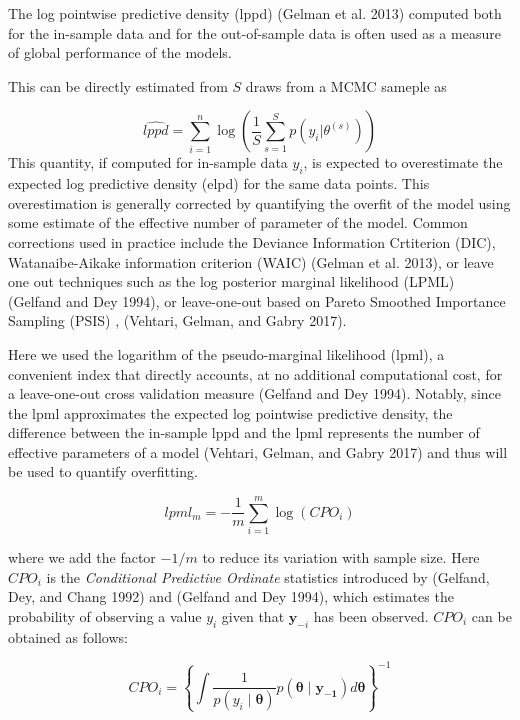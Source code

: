\documentclass[]{article}
\begin{document}
The log pointwise predictive density (lppd) (Gelman et al. 2013)
computed both for the in-sample data and for the out-of-sample data is
often used as a measure of global performance of the models.

This can be directly estimated from \(S\) draws from a MCMC sameple as

\begin{equation}
        \widehat{lppd} = \sum_{i = 1}^{n} \log \left( \frac{1}{S}\sum_{s = 1}^{S} p(y_i \lvert
    {\theta}^{(s)})\right)
\end{equation} This quantity, if computed for in-sample data \(y_i\), is
expected to overestimate the expected log predictive density (elpd) for
the same data points. This overestimation is generally corrected by
quantifying the overfit of the model using some estimate of the
effective number of parameter of the model. Common corrections used in
practice include the Deviance Information Crtiterion (DIC),
Watanaibe-Aikake information criterion (WAIC) (Gelman et al. 2013), or
leave one out techniques such as the log posterior marginal likelihood
(LPML) (Gelfand and Dey 1994), or leave-one-out based on Pareto Smoothed
Importance Sampling (PSIS) , (Vehtari, Gelman, and Gabry 2017).

Here we used the logarithm of the pseudo-marginal likelihood (lpml), a
convenient index that directly accounts, at no additional computational
cost, for a leave-one-out cross validation measure (Gelfand and Dey
1994). Notably, since the lpml approximates the expected log pointwise
predictive density, the difference between the in-sample lppd and the
lpml represents the number of effective parameters of a model (Vehtari,
Gelman, and Gabry 2017) and thus will be used to quantify overfitting.

\begin{equation}
    lpml_m = -\frac{1}{m}\sum_{i = 1}^{m} \log{\left( CPO_i \right)}
\end{equation}

where we add the factor \(-1/m\) to reduce its variation with sample
size. Here \(CPO_i\) is the \emph{Conditional Predictive Ordinate}
statistics introduced by (Gelfand, Dey, and Chang 1992) and (Gelfand and
Dey 1994), which estimates the probability of observing a value \(y_i\)
given that \(\mathbf{y}_{-i}\) has been observed. \(CPO_i\) can be
obtained as follows:

\begin{equation}
    CPO_i =  \left\{\int \frac{1}{p\left( y_i \mid
        \mathbf{\theta}\right)} p \left( \mathbf{\theta} \mid
    \mathbf{y_{-1}} \right) d \mathbf{\theta} \right\}^{-1}
\end{equation}
\end{document}
